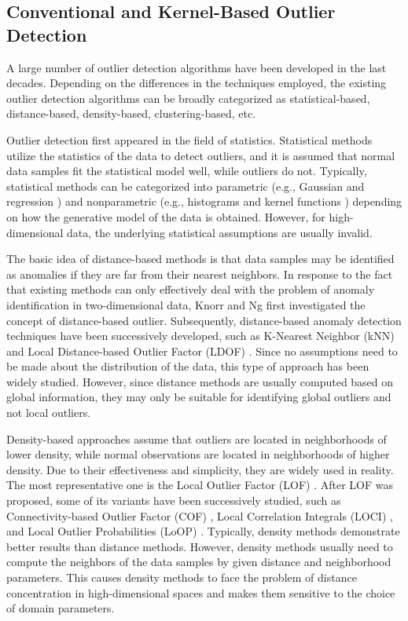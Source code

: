\documentclass[ASNA,twocolumn]{USG} %
\begin{document}
\subsection{Conventional and Kernel-Based Outlier Detection}

A large number of outlier detection algorithms have been developed in the last decades. Depending on the differences in the techniques employed, the existing outlier detection algorithms can be broadly categorized as statistical-based, distance-based, density-based, clustering-based, etc. 

Outlier detection first appeared in the field of statistics. Statistical methods utilize the statistics of the data to detect outliers, and it is assumed that normal data samples fit the statistical model well, while outliers do not. Typically, statistical methods can be categorized into parametric (e.g., Gaussian \cite{rippel2021gaussian} and regression \cite{mok2010random}) and nonparametric (e.g., histograms \cite{goldstein2012histogram} and kernel functions \cite{latecki2007outlier}) depending on how the generative model of the data is obtained. However, for high-dimensional data, the underlying statistical assumptions are usually invalid.

The basic idea of distance-based methods is that data samples may be identified as anomalies if they are far from their nearest neighbors. In response to the fact that existing methods can only effectively deal with the problem of anomaly identification in two-dimensional data, Knorr and Ng \cite{knorr1998algorithms} first investigated the concept of distance-based outlier.
Subsequently, distance-based anomaly detection techniques have been successively developed, such as K-Nearest Neighbor (kNN) \cite{ramaswamy2000efficient} and Local Distance-based Outlier Factor (LDOF) \cite{zhang2009new}.
Since no assumptions need to be made about the distribution of the data, this type of approach has been widely studied. However, since distance methods are usually computed based on global information, they may only be suitable for identifying global outliers and not local outliers.

Density-based approaches assume that outliers are located in neighborhoods of lower density, while normal observations are located in neighborhoods of higher density. Due to their effectiveness and simplicity, they are widely used in reality. The most representative one is the Local Outlier Factor (LOF) \cite{breunig2000lof}. After LOF was proposed, some of its variants have been successively studied, such as Connectivity-based Outlier Factor (COF) \cite{tang2002enhancing}, Local Correlation Integrals (LOCI) \cite{papadimitriou2003loci}, and Local Outlier Probabilities (LoOP) \cite{kriegel2009loop}. 
Typically, density methods demonstrate better results than distance methods. However, density methods usually need to compute the neighbors of the data samples by given distance and neighborhood parameters. This causes density methods to face the problem of distance concentration in high-dimensional spaces and makes them sensitive to the choice of domain parameters.
\end{document}
